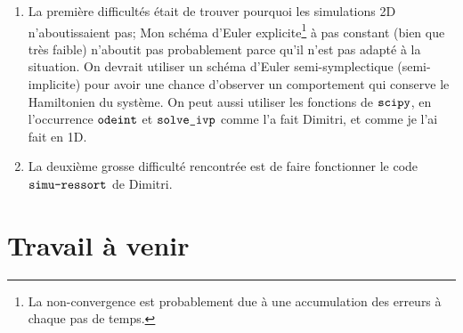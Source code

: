 \documentclass[
  french,
	11pt, %
]{fphw}
\begin{document}
\begin{enumerate}
  \item La première difficultés était de trouver pourquoi les simulations 2D n'aboutissaient pas; Mon schéma d'Euler explicite\footnote{La non-convergence est probablement due à une accumulation des erreurs à chaque pas de temps.} à pas constant (bien que très faible) n'aboutit pas probablement parce qu'il n'est pas adapté à la situation. On devrait utiliser un schéma d'Euler semi-symplectique (semi-implicite) pour avoir une chance d'observer un comportement qui conserve le Hamiltonien du système. On peut aussi utiliser les fonctions de $\verb|scipy|$, en l'occurrence $\verb|odeint|$ et $\verb|solve_ivp|$ comme l'a fait Dimitri, et comme je l'ai fait en 1D.
  \item La deuxième grosse difficulté rencontrée est de faire fonctionner le code $\verb|simu-ressort|$ de Dimitri.
\end{enumerate}



\section*{Travail à venir}
\end{document}
